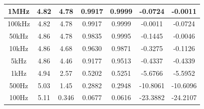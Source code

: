 \documentclass[12pt]{article}
\begin{document}
\begin{table}[H]
\begin{tabular}{|c|c|c|c|c|c|c|}
1MHz      & 4.82                                                                 & 4.78 & 0.9917                                                                  & 0.9999                                                                              & -0.0724                                                                        & -0.0011                                                                                    \\ \hline
100kHz    & 4.82                                                                 & 4.78 & 0.9917                                                                  & 0.9999 & -0.0011 & -0.0724 \\ \hline
50kHz     & 4.86                                                                 & 4.78                                                                       & 0.9835                                                                 & 0.9995 & -0.1445                                                                        & -0.0046 \\ \hline
10kHz     & 4.86                                                                 & 4.68                                                                        & 0.9630                                                                  & 0.9871 & -0.3275                                                                        & -0.1126 \\ \hline
5kHz      & 4.86                                                                 & 4.46 & 0.9177                                                                  & 0.9513                                                                              & -0.4337                                                                        & -0.4339 \\ \hline
1kHz      & 4.94                                                                 & 2.57                                                                        & 0.5202                                                                  & 0.5251                                                                              & -5.6766                                                                         & -5.5952 \\ \hline
500Hz     & 5.03                                                                 & 1.45                                                                        & 0.2882                                                                  & 0.2948                                                                              & -10.8061                                                                         & -10.6096 \\ \hline
100Hz     & 5.11                                                                 & 0.346                                                                        & 0.0677                                                                  & 0.0616 & -23.3882                                                                         & -24.2107 \\ \hline
\end{tabular}
\end{table}
\end{document}
